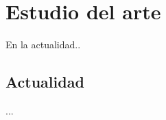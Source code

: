 \chapter{Estudio del arte}

\bigskip
En la actualidad..

\newpage
\section{Actualidad}

\bigskip
...











